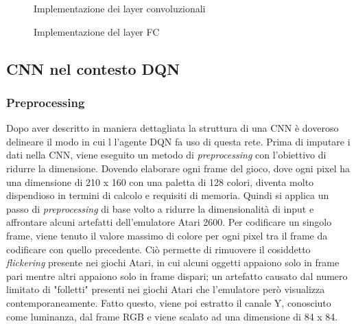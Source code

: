 \documentclass[twoside,twocolumn,10pt]{extarticle}
\theoremstyle{definition}
\begin{document}
\begin{figure}[ht!]
	\centering
	
	\caption{Implementazione dei layer convoluzionali}
	\label{fig:layerConv}
\end{figure}

\begin{figure}[ht!]
	\centering
	
	\caption{Implementazione del layer FC}
	\label{fig:layerFC}
\end{figure}

\subsection{CNN nel contesto DQN}
\subsubsection{Preprocessing}\label{subsubsec:preproc}
Dopo aver descritto in maniera dettagliata la struttura di una CNN è doveroso delineare il modo in cui l l'agente DQN fa uso di questa rete. Prima di imputare i dati nella CNN, viene eseguito un metodo di \textit{preprocessing} con l'obiettivo di ridurre la dimensione. Dovendo elaborare ogni frame del gioco, dove ogni pixel ha una dimensione di 210 x 160 con una paletta di 128 colori, diventa molto dispendioso in termini di calcolo e requisiti di memoria. Quindi si applica un passo di \textit{preprocessing} di base volto a ridurre la dimensionalità di input e affrontare alcuni artefatti dell'emulatore Atari 2600.
Per codificare un singolo frame, viene tenuto il valore massimo di colore per ogni pixel tra il frame da codificare con quello precedente. Ciò permette di rimuovere il cosiddetto \textit{flickering} presente nei giochi Atari, in cui alcuni oggetti appaiono solo in frame pari mentre altri appaiono solo in frame dispari; un artefatto causato dal numero limitato di "folletti" presenti nei giochi Atari che l'emulatore però visualizza contemporaneamente. Fatto questo, viene poi estratto il canale Y, conosciuto come luminanza, dal frame RGB e viene scalato ad una dimensione di 84 x 84.
\end{document}
